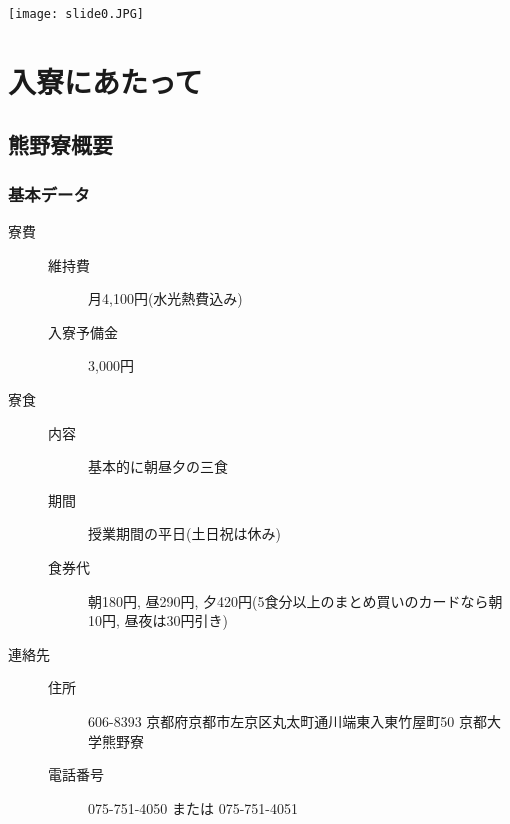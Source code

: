 \documentclass[10pt,b5jsbook,dvips,dvipdfmx,openany]{jsbook}
\theoremstyle{definition}
\begin{document}
   
\texttt{[image: slide0.JPG]}

\chapter{入寮にあたって}
	\section{熊野寮概要} \label{sec:abst}

		\subsection{基本データ} \label{subsec:data}
		\begin{description} 
		\item[寮費] \hspace{10mm}
			\begin{description}
			\item[維持費] 月4,100円(水光熱費込み)
			\item[入寮予備金] 3,000円
			\end{description}
		\item[寮食] \hspace{10mm} 
			\begin{description}
			\item[内容] 基本的に朝昼夕の三食
			\item[期間] 授業期間の平日(土日祝は休み)
			\item[食券代] 朝180円, 昼290円, 夕420円(5食分以上のまとめ買いのカードなら朝10円, 昼夜は30円引き)
			\end{description}
		\item[連絡先] \hspace{10mm} 
			\begin{description}
			\item[住所]606-8393 京都府京都市左京区丸太町通川端東入東竹屋町50 京都大学熊野寮
			\item[電話番号] 075-751-4050 または 075-751-4051
			\end{description}
		\end{description}

\end{document}

